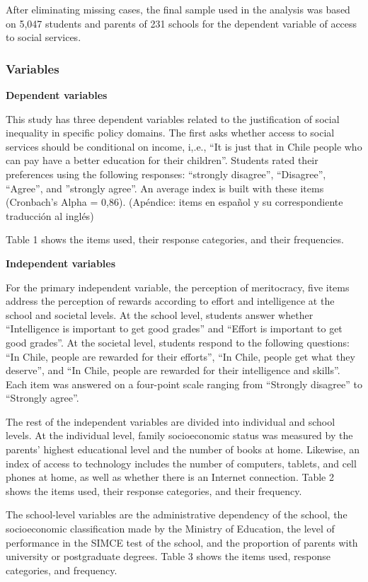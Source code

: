 \documentclass[
  letterpaper,
  DIV=11,
  numbers=noendperiod]{scrartcl}
\begin{document}
After eliminating missing cases, the final sample used in the analysis
was based on 5,047 students and parents of 231 schools for the dependent
variable of access to social services.

\subsubsection{Variables}\label{variables}

\textbf{Dependent variables}

This study has three dependent variables related to the justification of
social inequality in specific policy domains. The first asks whether
access to social services should be conditional on income, i,.e., ``It
is just that in Chile people who can pay have a better education for
their children''. Students rated their preferences using the following
responses: ``strongly disagree'', ``Disagree'', ``Agree'', and
''strongly agree''. An average index is built with these items
(Cronbach's Alpha = 0,86). (Apéndice: items en español y su
correspondiente traducción al inglés)

Table 1 shows the items used, their response categories, and their
frequencies.

\textbf{Independent variables}

For the primary independent variable, the perception of meritocracy,
five items address the perception of rewards according to effort and
intelligence at the school and societal levels. At the school level,
students answer whether ``Intelligence is important to get good grades''
and ``Effort is important to get good grades''. At the societal level,
students respond to the following questions: ``In Chile, people are
rewarded for their efforts'', ``In Chile, people get what they
deserve'', and ``In Chile, people are rewarded for their intelligence
and skills''. Each item was answered on a four-point scale ranging from
``Strongly disagree'' to ``Strongly agree''.

The rest of the independent variables are divided into individual and
school levels. At the individual level, family socioeconomic status was
measured by the parents' highest educational level and the number of
books at home. Likewise, an index of access to technology includes the
number of computers, tablets, and cell phones at home, as well as
whether there is an Internet connection. Table 2 shows the items used,
their response categories, and their frequency.

The school-level variables are the administrative dependency of the
school, the socioeconomic classification made by the Ministry of
Education, the level of performance in the SIMCE test of the school, and
the proportion of parents with university or postgraduate degrees. Table
3 shows the items used, response categories, and frequency.
\end{document}
